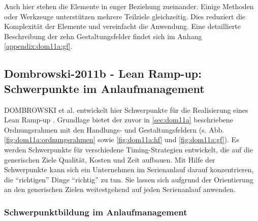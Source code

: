 Auch hier stehen die Elemente in enger Beziehung zueinander. Einige Methoden oder Werkzeuge unterstützen mehrere Teilziele gleichzeitig. Dies reduziert die Komplexität der Elemente und vereinfacht die Anwendung. 
Eine detaillierte Beschreibung der zehn Gestaltungsfelder findet sich im Anhang \ref{appendix:dom11a:gf}. 
% 

\subsection*{Dombrowski-2011b - Lean Ramp-up: Schwerpunkte im Anlaufmanagement}

DOMBROWSKI et al. entwickelt hier Schwerpunkte für die Realisierung eines Lean Ramp-up \cite{Dombrowski2011b}. Grundlage bietet der zuvor in \ref{sec:dom11a} beschriebene Ordnungsrahmen mit den Handlungs- und Gestaltungsfeldern (s. Abb. \ref{fig:dom11a:ordnungsrahmen} sowie \ref{fig:dom11a:hf} und \ref{fig:dom11a:gf}). Es werden Schwerpunkte für verschiedene Timing-Strategien entwickelt, die auf die generischen Ziele Qualität, Kosten und Zeit aufbauen. Mit Hilfe der Schwerpunkte kann sich ein Unternehmen im Serienanlauf darauf konzentrieren, die ``richtigen'' Dinge ``richtig'' zu tun. Sie lassen sich aufgrund der Orientierung an den generischen Zielen weitestgehend auf jeden Serienanlauf anwenden. 

\subsubsection{Schwerpunktbildung im Anlaufmanagement}\label{sec:schwerpunktbildung}

